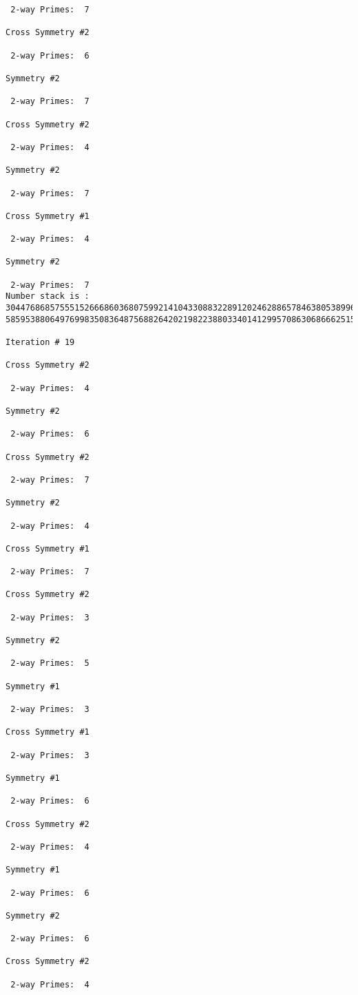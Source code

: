 {{{{\begin{verbatim}
 2-way Primes: 	7

Cross Symmetry #2

 2-way Primes: 	6

Symmetry #2

 2-way Primes: 	7

Cross Symmetry #2

 2-way Primes: 	4

Symmetry #2

 2-way Primes: 	7

Cross Symmetry #1

 2-way Primes: 	4

Symmetry #2

 2-way Primes: 	7
Number stack is :
30447686857555152666860368075992141043308832289120246288657846380538996794608835958544046240163340857
58595388064976998350836487568826420219822388033401412995708630686662515557586867440375804336104264044

Iteration #	19

Cross Symmetry #2

 2-way Primes: 	4

Symmetry #2

 2-way Primes: 	6

Cross Symmetry #2

 2-way Primes: 	7

Symmetry #2

 2-way Primes: 	4

Cross Symmetry #1

 2-way Primes: 	7

Cross Symmetry #2

 2-way Primes: 	3

Symmetry #2

 2-way Primes: 	5

Symmetry #1

 2-way Primes: 	3

Cross Symmetry #1

 2-way Primes: 	3

Symmetry #1

 2-way Primes: 	6

Cross Symmetry #2

 2-way Primes: 	4

Symmetry #1

 2-way Primes: 	6

Symmetry #2

 2-way Primes: 	6

Cross Symmetry #2

 2-way Primes: 	4


\end{verbatim}}}}}
